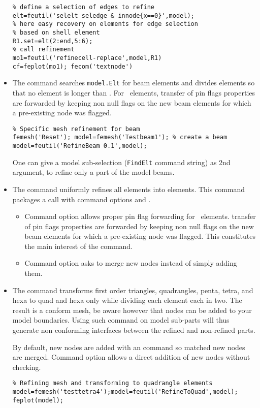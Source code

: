 \begin{itemize}
\begin{verbatim}
% define a selection of edges to refine
elt=feutil('selelt seledge & innode{x==0}',model); 
% here easy recovery on elements for edge selection
% based on shell element
R1.set=elt(2:end,5:6);
% call refinement
mo1=feutil('refinecell-replace',model,R1)
cf=feplot(mo1); fecom('textnode')
\end{verbatim}%


\item The  command searches {\tt model.Elt} for beam elements and divides elements so that no element is longer than . For \beam\ elements, transfer of pin flags properties are forwarded by keeping non null flags on the new beam elements for which a pre-existing node was flagged.

\begin{verbatim}
% Specific mesh refinement for beam
femesh('Reset'); model=femesh('Testbeam1'); % create a beam
model=feutil('RefineBeam 0.1',model);
\end{verbatim}%
One can give a model sub-selection ({\tt FindElt} command string) as 2nd argument, to refine only a part of the model beams.


\item The  command uniformly refines all \beam elements into  elements. This command packages a  call with command options  and . 
\begin{itemize}
\item Command option  allows proper pin flag forwarding for \beam\ elements. transfer of pin flags properties are forwarded by keeping non null flags on the new beam elements for which a pre-existing node was flagged. This constitutes the main interest of the command.
\item Command option  asks to merge new nodes instead of simply adding them.
\end{itemize}

\item The   command transforms first order triangles, quadrangles, penta, tetra, and hexa to quad and hexa only while dividing each element each in two. The result is a conform mesh, be aware however that nodes can be added to your model boundaries. Using such command on model sub-parts will thus generate non conforming interfaces between the refined and non-refined parts.

By default, new nodes are added with an  command so matched new nodes are merged. Command option  allows a direct addition of new nodes without checking.

\begin{verbatim}
% Refining mesh and transforming to quadrangle elements
model=femesh('testtetra4');model=feutil('RefineToQuad',model);
feplot(model);
\end{verbatim}%

\end{itemize}

